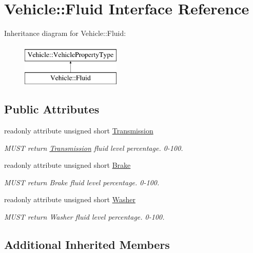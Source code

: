 \hypertarget{interfaceVehicle_1_1Fluid}{\section{Vehicle\-:\-:Fluid Interface Reference}
\label{interfaceVehicle_1_1Fluid}
}
Inheritance diagram for Vehicle\-:\-:Fluid\-:\begin{figure}[H]
\begin{center}
\leavevmode
\includegraphics[height=2.000000cm]{interfaceVehicle_1_1Fluid}
\end{center}
\end{figure}
\subsection*{Public Attributes}
\begin{DoxyCompactItemize}
\item 
readonly attribute unsigned short \hyperlink{interfaceVehicle_1_1Fluid_a5b4f0e96ac48825118ff67bb5b3395f9}{Transmission}
\begin{DoxyCompactList}\small\item\em M\-U\-S\-T return \hyperlink{interfaceVehicle_1_1Transmission}{Transmission} fluid level percentage. 0-\/100. \end{DoxyCompactList}\item 
readonly attribute unsigned short \hyperlink{interfaceVehicle_1_1Fluid_af8143827fe7cbb348f5e127e00d3bf61}{Brake}
\begin{DoxyCompactList}\small\item\em M\-U\-S\-T return Brake fluid level percentage. 0-\/100. \end{DoxyCompactList}\item 
readonly attribute unsigned short \hyperlink{interfaceVehicle_1_1Fluid_af75b190a62ab4b5f1a6de1e94de91520}{Washer}
\begin{DoxyCompactList}\small\item\em M\-U\-S\-T return Washer fluid level percentage. 0-\/100. \end{DoxyCompactList}\end{DoxyCompactItemize}
\subsection*{Additional Inherited Members}


